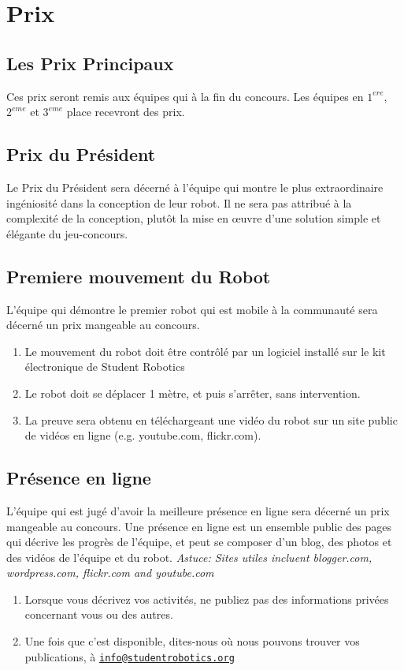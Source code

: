 \section {Prix}
\label{sec:Awards}

\subsection{Les Prix Principaux}
Ces prix seront remis aux équipes qui à la fin du concours. Les équipes en $1^{ere}$, $2^{eme}$ et $3^{eme}$ place recevront des prix.

\subsection{Prix du Président}
Le Prix du Président sera décerné à l'équipe qui montre le plus extraordinaire ingéniosité dans la conception de leur robot. Il ne sera pas attribué à la complexité de la conception, plutôt la mise en œuvre d'une solution simple et élégante du jeu-concours.

\subsection{Premiere mouvement du Robot}
L'équipe qui démontre le premier robot qui est mobile à la communauté sera décerné un prix mangeable au concours.
\begin{enumerate}
\item Le mouvement du robot doit être contrôlé par un logiciel installé sur le kit électronique de Student Robotics
\item Le robot doit se déplacer 1 mètre, et puis s'arrêter, sans intervention.
\item La preuve sera obtenu en téléchargeant une vidéo du robot sur un site public de vidéos en ligne (e.g. youtube.com, flickr.com).
\end{enumerate}


\subsection{Présence en ligne}
L'équipe qui est jugé d'avoir la meilleure présence en ligne sera décerné un prix mangeable au concours. Une présence en ligne est un ensemble public des pages qui décrive les progrès de l'équipe, et peut se composer d'un blog, des photos et des vidéos de l'équipe et du robot.  \emph{Astuce: Sites utiles incluent blogger.com, wordpress.com, flickr.com and youtube.com}
\begin{enumerate}
\item Lorsque vous décrivez vos activités, ne publiez pas des informations privées concernant vous ou des autres.
\item Une fois que c'est disponible, dites-nous où nous pouvons trouver vos publications, à \linebreak\href{mailto:info@studentrobotics.org}{\nolinkurl{info@studentrobotics.org}}
\end{enumerate}
